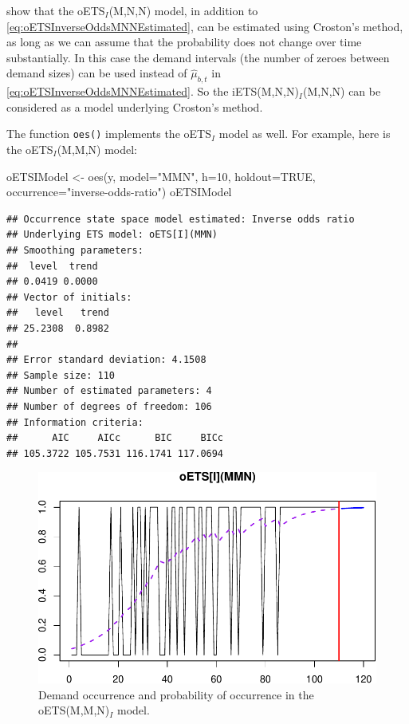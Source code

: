 \documentclass[
]{book}
\newenvironment{Shaded}{\begin{snugshade}}{\end{snugshade}}
\newcommand{\AttributeTok}[1]{\textcolor[rgb]{0.77,0.63,0.00}{#1}}
\newcommand{\ConstantTok}[1]{\textcolor[rgb]{0.00,0.00,0.00}{#1}}
\newcommand{\DecValTok}[1]{\textcolor[rgb]{0.00,0.00,0.81}{#1}}
\newcommand{\FunctionTok}[1]{\textcolor[rgb]{0.00,0.00,0.00}{#1}}
\newcommand{\NormalTok}[1]{#1}
\newcommand{\OtherTok}[1]{\textcolor[rgb]{0.56,0.35,0.01}{#1}}
\newcommand{\StringTok}[1]{\textcolor[rgb]{0.31,0.60,0.02}{#1}}
\theoremstyle{definition}
\theoremstyle{definition}
\theoremstyle{definition}
\theoremstyle{definition}
\theoremstyle{remark}
\begin{document}
\citet{Svetunkov2019a} show that the oETS\(_I\)(M,N,N) model, in addition to \eqref{eq:oETSInverseOddsMNNEstimated}, can be estimated using Croston's method, as long as we can assume that the probability does not change over time substantially. In this case the demand intervals (the number of zeroes between demand sizes) can be used instead of \(\hat{\mu}_{b,t}\) in \eqref{eq:oETSInverseOddsMNNEstimated}. So the iETS(M,N,N)\(_I\)(M,N,N) can be considered as a model underlying Croston's method.

The function \texttt{oes()} implements the oETS\(_I\) model as well. For example, here is the oETS\(_I\)(M,M,N) model:

\begin{Shaded}
\begin{Highlighting}[]
\NormalTok{oETSIModel }\OtherTok{\textless{}{-}} \FunctionTok{oes}\NormalTok{(y, }\AttributeTok{model=}\StringTok{"MMN"}\NormalTok{, }\AttributeTok{h=}\DecValTok{10}\NormalTok{, }\AttributeTok{holdout=}\ConstantTok{TRUE}\NormalTok{,}
                  \AttributeTok{occurrence=}\StringTok{"inverse{-}odds{-}ratio"}\NormalTok{)}
\NormalTok{oETSIModel}
\end{Highlighting}
\end{Shaded}

\begin{verbatim}
## Occurrence state space model estimated: Inverse odds ratio
## Underlying ETS model: oETS[I](MMN)
## Smoothing parameters:
##  level  trend 
## 0.0419 0.0000 
## Vector of initials:
##   level   trend 
## 25.2308  0.8982 
## 
## Error standard deviation: 4.1508
## Sample size: 110
## Number of estimated parameters: 4
## Number of degrees of freedom: 106
## Information criteria: 
##      AIC     AICc      BIC     BICc 
## 105.3722 105.7531 116.1741 117.0694
\end{verbatim}

\begin{figure}
\centering
\includegraphics{Svetunkov--2022----ADAM_files/figure-latex/oETSIModel-1.pdf}
\caption{\label{fig:oETSIModel}Demand occurrence and probability of occurrence in the oETS(M,M,N)\(_I\) model.}
\end{figure}
\end{document}
